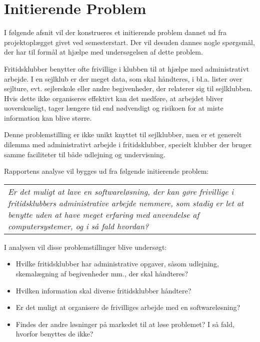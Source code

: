 \section{Initierende Problem}
I følgende afsnit vil der konstrueres et initierende problem dannet ud fra projektoplægget givet ved semesterstart. Der vil desuden dannes nogle spørgsmål, der har til formål at hjælpe med undersøgelsen af dette problem.

Fritidsklubber benytter ofte frivillige i klubben til at hjælpe med administrativt arbejde. \citep{Frivilligrapporten}
I en sejlklub er der meget data, som skal håndteres, i bl.a. lister over sejlture, evt. sejlerskole eller andre begivenheder, der relaterer sig til sejlklubben. 
Hvis dette ikke organiseres effektivt kan det medføre, at arbejdet bliver uoverskueligt, tager længere tid end nødvendigt og risikoen for at miste information kan blive større.

Denne problemstilling er ikke unikt knyttet til sejlklubber, men er et generelt dilemma med administrativt arbejde i fritidsklubber, specielt klubber der bruger samme faciliteter til både udlejning og undervisning.

Rapportens analyse vil bygges ud fra følgende initierende problem:

\begin{center}
  \begin{tabular}{|p{14cm}|}
	\textit{Er det muligt at lave en softwareløsning, der kan gøre frivillige i fritidsklubbers administrative
	arbejde nemmere, som stadig er let at benytte uden at have meget erfaring med anvendelse af computersystemer, og i så fald hvordan?}
  \end{tabular}
\end{center}

I analysen vil disse problemstillinger blive undersøgt:

\begin{itemize}
  \item Hvilke fritidsklubber har administrative opgaver, såsom udlejning, skemalægning af begivenheder mm., der
        skal håndteres?
  \item Hvilken information skal diverse fritidsklubber håndtere?
  \item Er det muligt at organisere de frivilliges arbejde med en softwareløsning?
  \item Findes der andre løsninger på markedet til at løse problemet? I så fald, hvorfor benyttes de ikke?
\end{itemize}